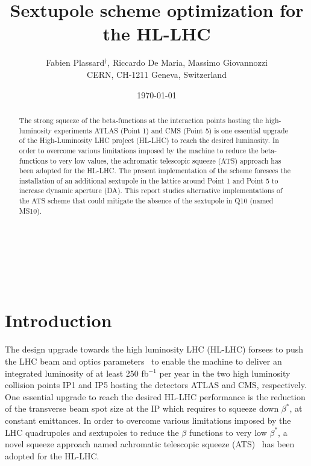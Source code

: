 \documentclass{cernatsnote}
\title{Sextupole scheme optimization for the HL-LHC}
\author{
	Fabien Plassard$^{\dagger}$, Riccardo De Maria, Massimo Giovannozzi \; \\		
	CERN, CH-1211 Geneva, Switzerland
}
\date{\today}
\begin{document}
\maketitle

\begin{abstract}
 The strong squeeze of the beta-functions at the interaction points hosting the high-luminosity experiments ATLAS (Point 1) and CMS (Point 5) is one essential upgrade of the High-Luminosity LHC project (HL-LHC) to reach the desired luminosity.
 In order to overcome various limitations imposed by the machine to reduce the beta-functions to very low values, the achromatic telescopic squeeze (ATS) approach has been adopted for the HL-LHC. The present implementation of the scheme foresees the installation of an additional sextupole in the lattice around Point 1 and Point 5 to increase dynamic aperture (DA). This report studies alternative implementations of the ATS scheme that could mitigate the absence of the sextupole in Q10 (named MS10).
 
 

\end{abstract}
\\ \\ \\ 

\begingroup
\color{black}
\tableofcontents
\endgroup

\pagebreak

\section{Introduction}

The design upgrade towards the high luminosity LHC (HL-LHC) forsees to push the LHC beam and optics parameters~\cite{hllhc_tdr} to enable the machine to deliver an integrated luminosity of at least 250 fb$^{-1}$ per year in the two high luminosity collision points IP1 and IP5 hosting the detectors ATLAS and CMS, respectively. One essential upgrade to reach the desired HL-LHC performance is the reduction of the transverse beam spot size at the IP which requires to squeeze down $\beta^{*}$, at constant emittances. In order to overcome various limitations imposed by the LHC quadrupoles and sextupoles to reduce the $\beta$ functions to very low $\beta^{*}$, a novel squeeze approach named achromatic telescopic squeeze (ATS)~\cite{ats} has been adopted for the HL-LHC.\\
\end{document}
